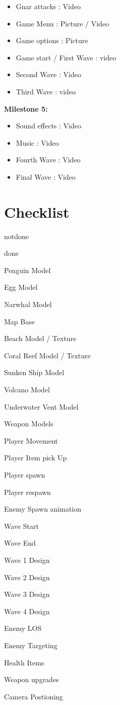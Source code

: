 \documentclass{article}
\newcommand{\cmark}{\ding{51}}%
\newcommand{\done}{\rlap{$\square$}{\raisebox{1pt}{\large\hspace{1pt}\cmark}}%
\hspace{-2.5pt}}
\begin{document}
\begin{adjustwidth}{2.5em}{0pt}
\begin{itemize}
\item Gnar attacks : Video
\item Game Menu : Picture / Video
\item Game options : Picture
\item Game start / First Wave : video
\item Second Wave : Video
\item Third Wave : video
\end{itemize}
\textbf{\large Milestone 5:}
\begin{itemize}
\item Sound effects : Video
\item Music : Video
\item Fourth Wave : Video
\item Final Wave : Video
\end{itemize}
\end{adjustwidth}
\section{Checklist}
\begin{todolist}
\item notdone
\item[\done] done
\item Penguin Model
\item Egg Model
\item Narwhal Model
\item Map Base
\item Beach Model / Texture
\item Coral Reef Model / Texture
\item Sunken Ship Model
\item Volcano Model
\item Underwater Vent Model
\item Weapon Models
\item Player Movement
\item Player Item pick Up
\item Player spawn
\item Player respawn
\item Enemy Spawn animation
\item Wave Start
\item Wave End
\item Wave 1 Design
\item Wave 2 Design
\item Wave 3 Design
\item Wave 4 Design
\item Enemy LOS
\item Enemy Targeting
\item Health Items
\item Weapon upgrades
\item Camera Postioning


\end{todolist}
\end{document}
